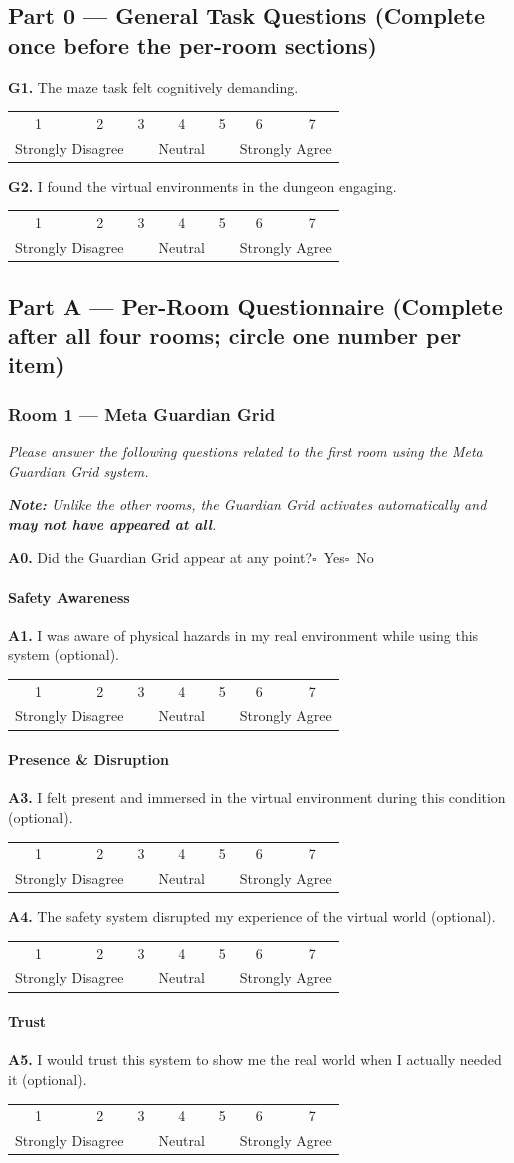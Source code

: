 \documentclass{styling/vgtc} %
\makeatletter
\newcommand{\likert}{%
  \par\smallskip
  \begin{center}\small
  \begin{tabular}{@{}ccccccc@{}}
    1 & 2 & 3 & 4 & 5 & 6 & 7 \\[-2pt]
    \multicolumn{2}{l}{\scriptsize Strongly Disagree} &
    & {\scriptsize Neutral} &
    & \multicolumn{2}{r}{\scriptsize Strongly Agree}
  \end{tabular}
  \end{center}\smallskip\noindent}
\makeatother
\begin{document}
\bigskip
\subsection*{Part 0 --- General Task Questions \textnormal{\small(Complete once before the per-room sections)}}

\noindent\textbf{G1.} The maze task felt cognitively demanding.\likert

\noindent\textbf{G2.} I found the virtual environments in the dungeon engaging.\likert

\bigskip
\subsection*{Part A --- Per-Room Questionnaire \textnormal{\small(Complete after all four rooms; circle one number per item)}}

\subsubsection*{Room 1 --- Meta Guardian Grid}

\noindent\textit{Please answer the following questions related to the first room using the Meta Guardian Grid system.}

\smallskip
\noindent\textit{\textbf{Note:} Unlike the other rooms, the Guardian Grid activates automatically and \textbf{may not have appeared at all}.}

\smallskip
\noindent\textbf{A0.} Did the Guardian Grid appear at any point?\quad $\square$~Yes\quad $\square$~No

\paragraph{Safety Awareness}
\noindent\textbf{A1.} I was aware of physical hazards in my real environment while using this system (optional).\likert

\paragraph{Presence \& Disruption}
\noindent\textbf{A3.} I felt present and immersed in the virtual environment during this condition (optional).\likert

\noindent\textbf{A4.} The safety system disrupted my experience of the virtual world (optional).\likert

\paragraph{Trust}
\noindent\textbf{A5.} I would trust this system to show me the real world when I actually needed it (optional).\likert
\end{document}
